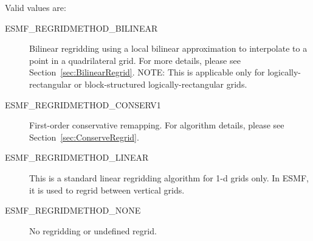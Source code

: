Valid values are:
\begin{description}

\item [ESMF\_REGRIDMETHOD\_BILINEAR]
     Bilinear regridding using a local bilinear approximation to interpolate
     to a point in a quadrilateral grid.  For more details, please see
     Section~\ref{sec:BilinearRegrid}.  NOTE: This is applicable only for
     logically-rectangular or block-structured logically-rectangular grids.

\item[ESMF\_REGRIDMETHOD\_CONSERV1]
     First-order conservative remapping.  For algorithm details, please see
     Section~\ref{sec:ConserveRegrid}.

\item[ESMF\_REGRIDMETHOD\_LINEAR  ]
     This is a standard linear regridding algorithm for 1-d grids only.  In ESMF,
     it is used to regrid between vertical grids.

\item [ESMF\_REGRIDMETHOD\_NONE]
     No regridding or undefined regrid.
\end{description}



